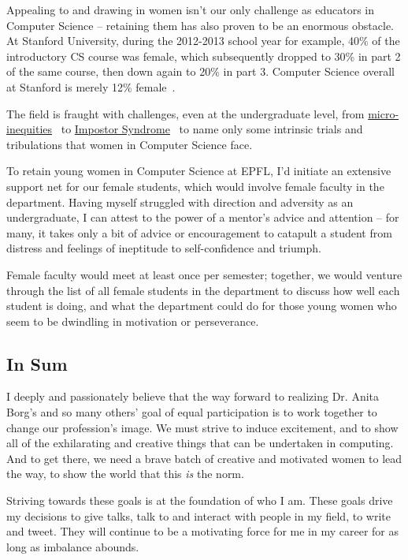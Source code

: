 \documentclass[acmtocl]{acmtrans2m}
\begin{document}
Appealing to and drawing in women isn't our only challenge as educators in
Computer Science -- retaining them has also proven to be an enormous obstacle.
At Stanford University, during the 2012-2013 school year for example, 40\% of
the introductory CS course was female, which subsequently dropped to 30\% in
part 2 of the same course, then down again to 20\% in part 3. Computer Science
overall at Stanford is merely 12\% female~\cite{ShePlusPlus}.

The field is fraught with challenges, even at the undergraduate level, from
\href{http://www.pgbovine.net/tech-privilege.htm}{micro-inequities}~\cite{MicroInequities} to
\href{http://www.networkworld.com/news/2012/061312-gmail-women-260169.html}{Impostor Syndrome}~\cite{ImpostorSyndrome}
to name only some intrinsic trials and tribulations that women in Computer
Science face.

To retain young women in Computer Science at EPFL, I'd initiate an extensive
support net for our female students, which would involve female faculty in the
department. Having myself struggled with direction and adversity as an
undergraduate, I can attest to the power of a mentor's advice and attention --
for many, it takes only a bit of advice or encouragement to catapult a
student from distress and feelings of ineptitude to self-confidence and
triumph.

Female faculty would meet at least once per semester; together, we would
venture through the list of all female students in the department to discuss
how well each student is doing, and what the department could do for those
young women who seem to be dwindling in motivation or perseverance.

\vspace{-0.15in}
\subsection*{\textbf{In Sum}}
\vspace{-0.1in}

I deeply and passionately believe that the way forward to realizing Dr. Anita
Borg's and so many others' goal of equal participation is to work together to
change our profession's image. We must strive to induce excitement, and to
show all of the exhilarating and creative things that can be undertaken in
computing. And to get there, we need a brave batch of creative and motivated
women to lead the way, to show the world that this \textit{is} the norm.

Striving towards these goals is at the foundation of who I am. These goals
drive my decisions to give talks, talk to and interact with people in my
field, to write and tweet. They will continue to be a motivating force for me
in my career for as long as imbalance abounds.
\end{document}
